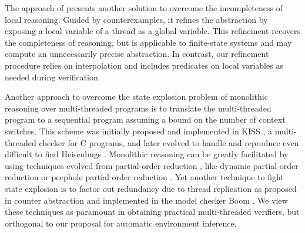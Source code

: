 The approach of \cite{CohenFMSD09} presents another
solution to overcome the incompleteness of local reasoning.
Guided by counterexamples, it refines the abstraction by exposing 
a local variable of a thread as a global variable. 
This refinement recovers the completeness of reasoning, but is
applicable to finite-state systems and may compute an unnecessarily
precise abstraction.
In contrast, our refinement procedure relies on interpolation and
includes predicates on local variables as needed during verification.

Another approach to overcome the state explosion problem of monolithic
reasoning over multi-threaded programs is to translate the
multi-threaded program to a sequential program assuming a bound on the
number of context switches.
This scheme was initially proposed and implemented in KISS
\cite{QadeerPLDI04}, a multi-threaded checker for C programs, and later
evolved to handle and reproduce even difficult to find Heisenbugs
\cite{MusuvathiOSDI08}.
Monolithic reasoning can be greatly facilitated by using techniques
evolved from partial-order reduction \cite{GodefroidPhd94}, like
dynamic partial-order reduction \cite{FlanaganPOPL05} or peephole
partial order reduction \cite{WangTACAS08}.
Yet another technique to fight state explosion is to factor out
redundancy due to thread replication as proposed in counter
abstraction \cite{PnueliCAV02} and implemented in the 
model checker Boom \cite{BaslerCAV09,BaslerTACAS10}.
We view these techniques as paramount in obtaining practical
multi-threaded verifiers, but orthogonal to our proposal for automatic
environment inference.




